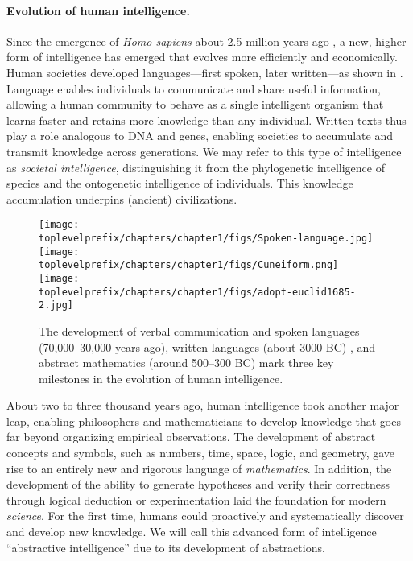 \documentclass[../../book-main.tex]{subfiles}
\begin{document}
\paragraph{Evolution of human intelligence.}
Since the emergence of \textit{Homo sapiens} about 2.5 million years ago \cite{Harari-2015}, a new, higher form of intelligence has emerged that evolves more efficiently and economically. Human societies developed languages---first spoken, later written---as shown in . Language enables individuals to communicate and share useful information, allowing a human community to behave as a single intelligent organism that learns faster and retains more knowledge than any individual. Written texts thus play a role analogous to DNA and genes, enabling societies to accumulate and transmit knowledge across generations. We may refer to this type of intelligence as \textit{societal intelligence}, distinguishing it from the phylogenetic intelligence of species and the ontogenetic intelligence of individuals. This knowledge accumulation underpins (ancient) civilizations.

\begin{figure}
    \centering
    \texttt{[image: \\toplevelprefix/chapters/chapter1/figs/Spoken-language.jpg]}
   \hspace{5mm} \texttt{[image: \\toplevelprefix/chapters/chapter1/figs/Cuneiform.png]}
   \hspace{5mm} \texttt{[image: \\toplevelprefix/chapters/chapter1/figs/adopt-euclid1685-2.jpg]}
    \caption{The development of verbal communication and spoken languages (70,000--30,000 years ago), written languages (about 3000 BC) \cite{schmandt2014evolution}, and abstract mathematics (around 500--300 BC) \cite{heath1956thirteen} mark three key milestones in the evolution of human intelligence.}
    \label{fig:human-intelligence}
\end{figure}

About two to three thousand years ago, human intelligence took another major leap, enabling philosophers and mathematicians to develop knowledge that goes far beyond organizing empirical observations. The development of abstract concepts and symbols, such as numbers, time, space, logic, and geometry, gave rise to an entirely new and rigorous language of \textit{mathematics}. In addition, the development of the ability to generate hypotheses and verify their correctness through logical deduction or experimentation laid the foundation for modern \textit{science}. For the first time, humans could proactively and systematically discover and develop new knowledge. We will call this advanced form of intelligence ``abstractive intelligence'' due to its development of abstractions.
\end{document}

